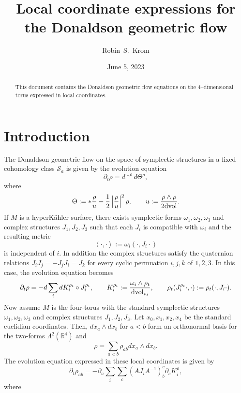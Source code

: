 \documentclass[a4paper]{article}
\title{Local coordinate expressions for the Donaldson geometric flow}
\author{Robin~S.~Krom}
\date{June 5, 2023}
\newcommand{\R}{{\mathbb R}}
\newcommand{\sS}{\mathscr{S}}
\newcommand{\om}{{\omega}}
\newcommand{\dvol}{{\rm dvol}}
\def\Abs#1{\left|#1\right|}
\newcommand{\p}{{\partial}}
\begin{document}
\maketitle

\begin{abstract}
This document contains the Donaldson geometric flow equations on the 4--dimensional torus expressed in local coordinates.
\end{abstract}

\section{Introduction}
The Donaldson geometric flow on the space of symplectic structures in a fixed
cohomology class $\sS_a$ is given by the evolution equation
\begin{equation}\label{eq:flow}
\p_t \rho = d*^\rho d\Theta^\rho, 
\end{equation}
where
\begin{gather*}
\Theta := *\frac{\rho}{u} -\frac{1}{2}\Abs{\frac{\rho}{u}}^2\rho, \qquad u:= \frac{\rho\wedge\rho}{2\dvol}.
\end{gather*}
If $M$ is a hyperK\"ahler surface, there exists symplectic forms $\om_1, \om_2, \om_3$ and complex structures $J_1, J_2, J_3$ such that each $J_i$ is compatible with $\om_i$ and the resulting metric
$$
\left<\cdot, \cdot \right> := \om_i(\cdot, J_i\cdot)
$$ 
is independent of $i$. In addition the complex structures satisfy the quaternion
relations $J_iJ_j = -J_jJ_i = J_k$ for every cyclic permuation $i,j,k$ of
$1,2,3$. In this case, the evolution equation becomes
$$
\p_t \rho = -d\sum_i dK_i^{\rho_t} \circ J_i^{\rho_t}, \qquad K_i^{\rho_t} := \frac{\om_i \wedge \rho_t}{\dvol_{\rho_t}}, \qquad \rho_t(J_i^{\rho_t}\cdot, \cdot) := \rho_t(\cdot, J_i\cdot).
$$
Now assume $M$ is the four-torus with the standard symplectic structures $\om_1, \om_2, \om_3$ and complex structures $J_1, J_2, J_3$. Let $x_0, x_1, x_2, x_4$ be the standard euclidian coordinates. Then, $dx_a \wedge dx_b$ for $a<b$ form an orthonormal basis for the two-forms $\Lambda^2(\R^4)$ and
$$
\rho = \sum_{a < b} \rho_{ab} dx_a \wedge dx_b.
$$
The evolution equation expressed in these local coordinates is given by
$$
\p_t \rho_{ab} = - \p_a\sum_i  \sum_c(A J_i A^{-1})_b^c \p_cK_i^\rho,
$$
where
\end{document}

